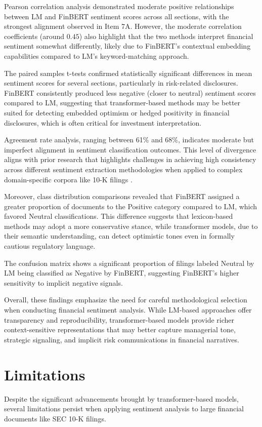 \documentclass[12pt]{article}
\begin{document}
Pearson correlation analysis demonstrated moderate positive relationships between LM and FinBERT sentiment scores across all sections, with the strongest alignment observed in Item 7A. However, the moderate correlation coefficients (around $0.45$) also highlight that the two methods interpret financial sentiment somewhat differently, likely due to FinBERT’s contextual embedding capabilities compared to LM’s keyword-matching approach.

The paired samples t-tests confirmed statistically significant differences in mean sentiment scores for several sections, particularly in risk-related disclosures. FinBERT consistently produced less negative (closer to neutral) sentiment scores compared to LM, suggesting that transformer-based methods may be better suited for detecting embedded optimism or hedged positivity in financial disclosures, which is often critical for investment interpretation.

Agreement rate analysis, ranging between 61\% and 68\%, indicates moderate but imperfect alignment in sentiment classification outcomes. This level of divergence aligns with prior research that highlights challenges in achieving high consistency across different sentiment extraction methodologies when applied to complex domain-specific corpora like 10-K filings \citep{Li2010}.

Moreover, class distribution comparisons revealed that FinBERT assigned a greater proportion of documents to the Positive category compared to LM, which favored Neutral classifications. This difference suggests that lexicon-based methods may adopt a more conservative stance, while transformer models, due to their semantic understanding, can detect optimistic tones even in formally cautious regulatory language.

The confusion matrix shows a significant proportion of filings labeled Neutral by LM being classified as Negative by FinBERT, suggesting FinBERT’s higher sensitivity to implicit negative signals.

Overall, these findings emphasize the need for careful methodological selection when conducting financial sentiment analysis. While LM-based approaches offer transparency and reproducibility, transformer-based models provide richer context-sensitive representations that may better capture managerial tone, strategic signaling, and implicit risk communications in financial narratives.

\section{Limitations}
Despite the significant advancements brought by transformer-based models, several limitations persist when applying sentiment analysis to large financial documents like SEC 10-K filings.
\end{document}
